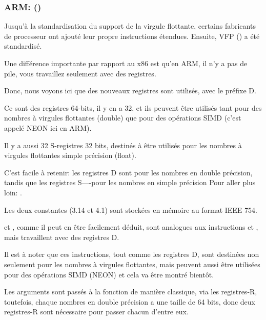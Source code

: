 \subsubsection{ARM: \OptimizingXcodeIV (\ARMMode)}

Jusqu'à la standardisation du support de la virgule flottante, certains fabricants
de processeur ont ajouté leur propre instructions étendues.
Ensuite, VFP () a été standardisé.

Une différence importante par rapport au x86 est qu'en ARM, il n'y a pas de pile,
vous travaillez seulement avec des registres.




Donc, nous voyons ici que des nouveaux registres sont utilisés, avec le préfixe D.

Ce sont des registres 64-bits, il y en a 32, et ils peuvent être utilisés tant pour
des nombres à virgules flottantes (double) que pour des opérations SIMD (c'est appelé
NEON ici en ARM).

Il y a aussi 32 S-registres 32 bits, destinés à être utilisés pour les nombres à
virgules flottantes simple précision (float).

C'est facile à retenir: les registres D sont pour les nombres en double précision,
tandis que les registres S----pour les nombres en simple précision
Pour aller plus loin: .

Les deux constantes (3.14 et 4.1) sont stockées en mémoire au format IEEE 754.

 et , comme il peut en être facilement déduit, sont analogues
aux instructions  et \MOV, mais travaillent avec des registres D.

Il est à noter que ces instructions, tout comme les registres D, sont destinées non
seulement pour les nombres à virgules flottantes, mais peuvent aussi être utilisées
pour des opérations SIMD (NEON) et cela va être montré bientôt.

Les arguments sont passés à la fonction de manière classique, via les registres-R,
toutefois, chaque nombres en double précision a une taille de 64 bits, donc deux
registres-R sont nécessaire pour passer chacun d'entre eux.

